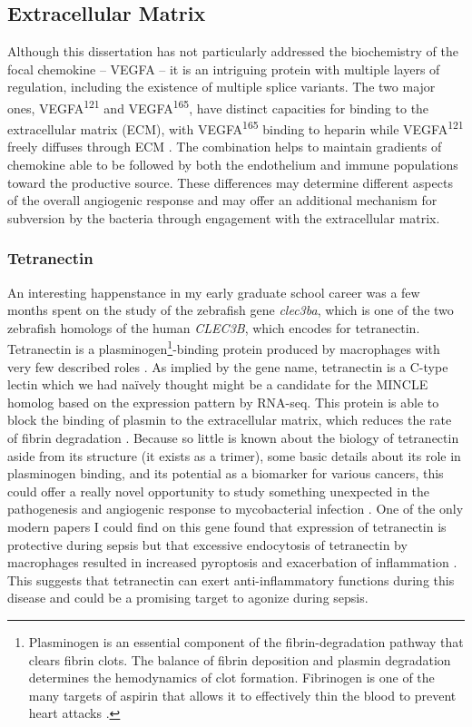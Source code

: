 \subsection{Extracellular Matrix}\label{ecm}

Although this dissertation has not particularly addressed the biochemistry of the focal chemokine -- VEGFA -- it is an intriguing protein with multiple layers of regulation, including the existence of multiple splice variants. The two major ones, VEGFA\textsuperscript{121} and VEGFA\textsuperscript{165}, have distinct capacities for binding to the extracellular matrix (ECM), with VEGFA\textsuperscript{165} binding to heparin while VEGFA\textsuperscript{121} freely diffuses through ECM \citep{Fearnley2016, Shibuya2011}. The combination helps to maintain gradients of chemokine able to be followed by both the endothelium and immune populations toward the productive source. These differences may determine different aspects of the overall angiogenic response and may offer an additional mechanism for subversion by the bacteria through engagement with the extracellular matrix. 

\subsubsection{Tetranectin}\label{clec3ba}

An interesting happenstance in my early graduate school career was a few months spent on the study of the zebrafish gene \textit{clec3ba}, which is one of the two zebrafish homologs of the human \textit{CLEC3B}, which encodes for tetranectin. Tetranectin is a plasminogen\footnote{Plasminogen is an essential component of the fibrin\hyp{}degradation pathway that clears fibrin clots. The balance of fibrin deposition and plasmin degradation determines the hemodynamics of clot formation. Fibrinogen is one of the many targets of aspirin that allows it to effectively thin the blood to prevent heart attacks \citep{Bjornsson1989, Keragala2021}.}\hyp{}binding protein produced by macrophages with very few described roles \citep{Nielsen1993}. As implied by the gene name, tetranectin is a C\hyp{}type lectin which we had na\"{i}vely thought might be a candidate for the MINCLE homolog based on the expression pattern by RNA\hyp{}seq. This protein is able to block the binding of plasmin to the extracellular matrix, which reduces the rate of fibrin degradation \citep{Mogues2004}. Because so little is known about the biology of tetranectin aside from its structure (it exists as a trimer), some basic details about its role in plasminogen binding, and its potential as a biomarker for various cancers, this could offer a really novel opportunity to study something unexpected in the pathogenesis and angiogenic response to mycobacterial infection \citep{Holtet1997, Nielsen1997, Graversen1998}. One of the only modern papers I could find on this gene found that expression of tetranectin is protective during sepsis but that excessive endocytosis of tetranectin by macrophages resulted in increased pyroptosis and exacerbation of inflammation \citep{Chen2020}. This suggests that tetranectin can exert anti\hyp{}inflammatory functions during this disease and could be a promising target to agonize during sepsis.


